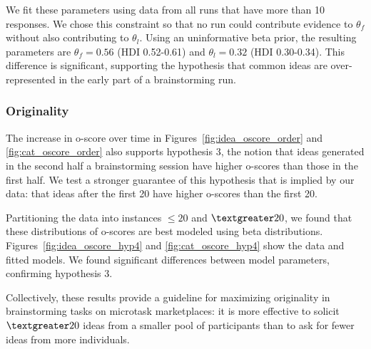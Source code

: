 We fit these parameters using data from all runs that have more than 10 responses. We chose this constraint so that no run could contribute evidence to $\theta_f$ without also contributing to $\theta_l$. Using an uninformative beta prior, the resulting parameters are $\theta_f = 0.56$ (HDI 0.52-0.61) and $\theta_l = 0.32$ (HDI 0.30-0.34). This difference is significant, supporting the hypothesis that common ideas are over-represented in the early part of a brainstorming run.



\subsubsection{Originality}

The increase in o-score over time in Figures~\ref{fig:idea_oscore_order} and \ref{fig:cat_oscore_order} also supports hypothesis 3, the notion that ideas generated in the second half a brainstorming session have higher o-scores than those in the first half. We test a stronger guarantee of this hypothesis that is implied by our data: that ideas after the first 20 have higher o-scores than the first 20.

Partitioning the data into instances $\leq20$ and $\textgreater20$, we found that these distributions of o-scores are best modeled using beta distributions. Figures~\ref{fig:idea_oscore_hyp4} and \ref{fig:cat_oscore_hyp4} show the data and fitted models. We found significant differences between model parameters, confirming hypothesis 3.

Collectively, these results provide a guideline for maximizing originality in brainstorming tasks on microtask marketplaces: it is more effective to solicit $\textgreater20$ ideas from a smaller pool of participants than to ask for fewer ideas from more individuals.





